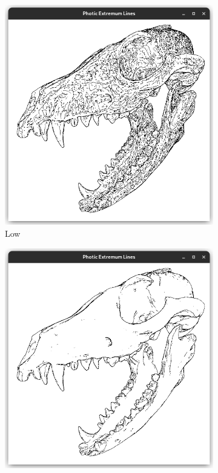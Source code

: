 \documentclass[9pt,fleqn,twoside,twocolumn]{stdglobal}
\begin{document}
    \begin{figure}[t]
      \centering
      \begin{subfigure}[b]{0.49\linewidth}
        \centering
        \includegraphics[width=\textwidth,trim={15px 15 15 50},clip]{images/fox-skull-threshold-low.png}
        \caption{Low}
      \end{subfigure}
      \begin{subfigure}[b]{0.49\linewidth}
        \centering
        \includegraphics[width=\textwidth,trim={15px 15 15 50},clip]{images/fox-skull-threshold-mid.png}

\end{subfigure}
\end{figure}
\end{document}
